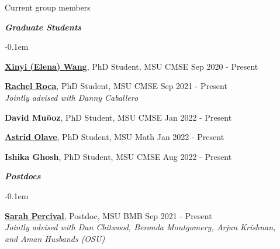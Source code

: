 \documentclass{resume} %
\begin{document}
\newpage
\begin{rSection}{Current group members}


\textbf{\textit{Graduate Students}}
\begin{list}{}{\leftmargin=1em}
   \itemsep -0.1em %







   \item \textbf{\href{https://elenaxwang.com/}{Xinyi (Elena) Wang}}, PhD Student, MSU CMSE \hfill Sep 2020 - Present


   \item \textbf{\href{https://sites.google.com/manhattan.edu/racheleroca/home}{Rachel Roca}}, PhD Student, MSU CMSE \hfill Sep 2021 - Present
\\
   \phantom{XXX} \textit{Jointly advised with Danny Caballero}


   \item \textbf{David Muñoz}, PhD Student, MSU CMSE \hfill Jan 2022 - Present
   

   \item \textbf{\href{https://aaolaveh.github.io/}{Astrid Olave}}, PhD Student, MSU Math \hfill Jan 2022 - Present
   

   
   \item \textbf{Ishika Ghosh}, PhD Student, MSU CMSE \hfill Aug 2022 - Present
   




\end{list}


\textbf{\textit{Postdocs}}
\begin{list}{}{\leftmargin=1em}
   \itemsep -0.1em %



   \item \textbf{\href{https://sperciva.github.io/}{Sarah Percival}}, Postdoc, MSU BMB \hfill Sep 2021 - Present\\
   \phantom{XXX} \textit{Jointly advised with Dan Chitwood, Beronda Montgomery, Arjun Krishnan,}\\
   \phantom{XXX} \textit{and Aman Husbands (OSU)}



\end{list}
\end{rSection}
\end{document}

